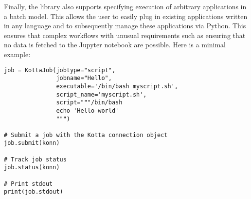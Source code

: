 Finally, the library also supports specifying execution of arbitrary applications in a batch model. This allows the user to easily
plug in existing applications written in any language and to subsequently manage these applications via Python. 
This ensures that complex workflows with unusual
requirements such as ensuring that no data is fetched to the Jupyter notebook are possible.
Here is a minimal example:

\begin{lstlisting}
job = KottaJob(jobtype="script",
               jobname="Hello",
               executable='/bin/bash myscript.sh',
               script_name='myscript.sh',
               script="""/bin/bash
               echo 'Hello world'
               """)

# Submit a job with the Kotta connection object
job.submit(konn)

# Track job status
job.status(konn)

# Print stdout
print(job.stdout)
\end{lstlisting}









